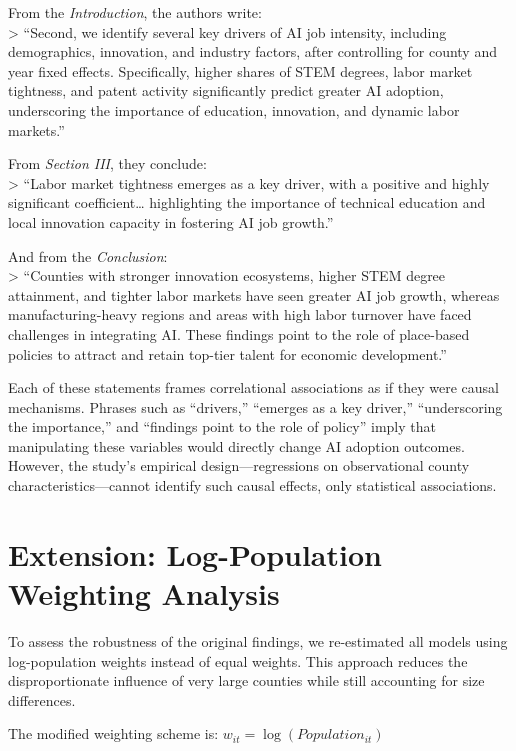 \documentclass[
]{article}
\begin{document}
From the \emph{Introduction}, the authors write:\\
\textgreater{} ``Second, we identify several key drivers of AI job
intensity, including demographics, innovation, and industry factors,
after controlling for county and year fixed effects. Specifically,
higher shares of STEM degrees, labor market tightness, and patent
activity significantly predict greater AI adoption, underscoring the
importance of education, innovation, and dynamic labor markets.''

From \emph{Section III}, they conclude:\\
\textgreater{} ``Labor market tightness emerges as a key driver, with a
positive and highly significant coefficient\ldots{} highlighting the
importance of technical education and local innovation capacity in
fostering AI job growth.''

And from the \emph{Conclusion}:\\
\textgreater{} ``Counties with stronger innovation ecosystems, higher
STEM degree attainment, and tighter labor markets have seen greater AI
job growth, whereas manufacturing-heavy regions and areas with high
labor turnover have faced challenges in integrating AI. These findings
point to the role of place-based policies to attract and retain top-tier
talent for economic development.''

Each of these statements frames correlational associations as if they
were causal mechanisms. Phrases such as ``drivers,'' ``emerges as a key
driver,'' ``underscoring the importance,'' and ``findings point to the
role of policy'' imply that manipulating these variables would directly
change AI adoption outcomes. However, the study's empirical
design---regressions on observational county characteristics---cannot
identify such causal effects, only statistical associations.

\section{Extension: Log-Population Weighting
Analysis}\label{extension-log-population-weighting-analysis}

To assess the robustness of the original findings, we re-estimated all
models using log-population weights instead of equal weights. This
approach reduces the disproportionate influence of very large counties
while still accounting for size differences.

The modified weighting scheme is: \(w_{it} = \log(Population_{it})\)
\end{document}
